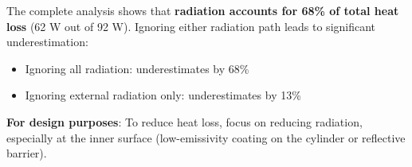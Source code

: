 \documentclass[11pt]{article}
\begin{document}
The complete analysis shows that \textbf{radiation accounts for 68\% of total heat loss} (62 W out of 92 W). Ignoring either radiation path leads to significant underestimation:
\begin{itemize}
    \item Ignoring all radiation: underestimates by 68\%
    \item Ignoring external radiation only: underestimates by 13\%
\end{itemize}

\textbf{For design purposes}: To reduce heat loss, focus on reducing radiation, especially at the inner surface (low-emissivity coating on the cylinder or reflective barrier).
\end{document}
